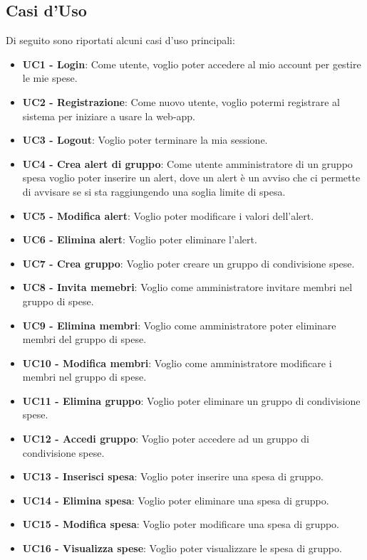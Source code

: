 

\subsection{Casi d'Uso}

Di seguito sono riportati alcuni casi d'uso principali:
\begin{itemize}
    \item \textbf{UC1 - Login}: Come utente, voglio poter accedere al mio account per gestire le mie spese.
    \item \textbf{UC2 - Registrazione}: Come nuovo utente, voglio potermi registrare al sistema per iniziare a usare la web-app.
    \item \textbf{UC3 - Logout}: Voglio poter terminare la mia sessione.
    \item \textbf{UC4 - Crea alert di gruppo}: Come utente amministratore di un gruppo spesa voglio poter inserire un alert, dove un alert è un avviso che ci permette di avvisare se si sta raggiungendo una soglia limite di spesa.
    \item \textbf{UC5 - Modifica alert}: Voglio poter modificare i valori dell'alert.
    \item \textbf{UC6 - Elimina alert}: Voglio poter eliminare l'alert. 
    \item \textbf{UC7 - Crea gruppo}: Voglio poter creare un gruppo di condivisione spese. 
    \item \textbf{UC8 - Invita memebri}: Voglio come amministratore invitare membri nel gruppo di spese.
    \item \textbf{UC9 - Elimina membri}: Voglio come amministratore poter eliminare membri del gruppo di spese.
    \item \textbf{UC10 - Modifica membri}: Voglio come amministratore modificare i membri nel gruppo di spese.
    \item \textbf{UC11 - Elimina gruppo}: Voglio poter eliminare un gruppo di condivisione spese. 
    \item \textbf{UC12 - Accedi gruppo}: Voglio poter accedere ad un gruppo di condivisione spese. 
    \item \textbf{UC13 - Inserisci spesa}: Voglio poter inserire una spesa di gruppo.
    \item \textbf{UC14 - Elimina spesa}: Voglio poter eliminare una spesa di gruppo.
    \item \textbf{UC15 - Modifica spesa}: Voglio poter modificare una spesa di gruppo.
    \item \textbf{UC16 - Visualizza spese}: Voglio poter visualizzare le spesa di gruppo.

\end{itemize}
